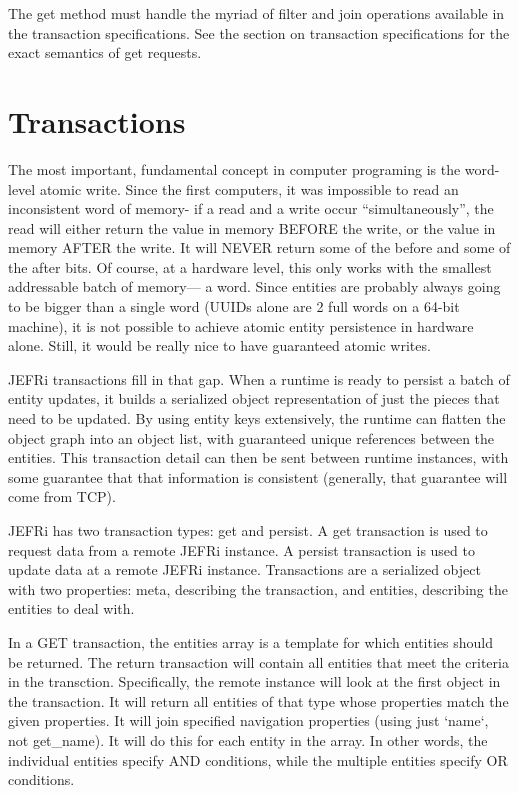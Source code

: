 \documentclass{article}
\begin{document}
The get method must handle the myriad of filter and join operations available in
the transaction specifications. See the section on transaction specifications
for the exact semantics of get requests.

\section{Transactions}
The most important, fundamental concept in computer programing is the word-level
atomic write. Since the first computers, it was impossible to read an
inconsistent word of memory- if a read and a write occur ``simultaneously'',
the read will either return the value in memory BEFORE the write, or the value
in memory AFTER the write. It will NEVER return some of the before and some of
the after bits. Of course, at a hardware level, this only works with the
smallest addressable batch of memory--- a word. Since entities are probably
always going to be bigger than a single word (UUIDs alone are 2 full words on a
64-bit machine), it is not possible to achieve atomic entity persistence in
hardware alone. Still, it would be really nice to have guaranteed atomic writes.

JEFRi transactions fill in that gap. When a runtime is ready to persist a batch
of entity updates, it builds a serialized object representation of just the
pieces that need to be updated. By using entity keys extensively, the runtime
can flatten the object graph into an object list, with guaranteed unique
references between the entities. This transaction detail can then be sent
between runtime instances, with some guarantee that that information is
consistent (generally, that guarantee will come from TCP).

JEFRi has two transaction types: get and persist. A get transaction is used to
request data from a remote JEFRi instance. A persist transaction is used to
update data at a remote JEFRi instance. Transactions are a serialized object
with two properties: meta, describing the transaction, and entities, describing
the entities to deal with.

In a GET transaction, the entities array is a template for which entities should
be returned. The return transaction will contain all entities that meet the
criteria in the transction. Specifically, the remote instance will look at the
first object in the transaction. It will return all entities of that type whose
properties match the given properties. It will join specified navigation
properties (using just `name`, not get\_name). It will do this for each entity
in the array. In other words, the individual entities specify AND conditions,
while the multiple entities specify OR conditions.
\end{document}
